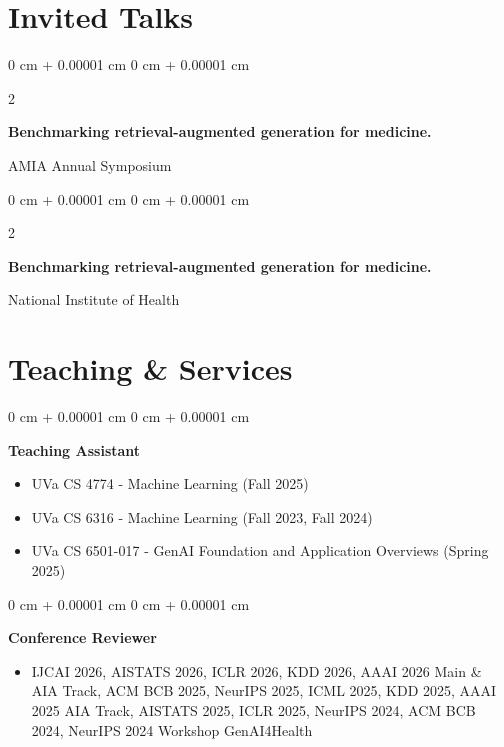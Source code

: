 \documentclass[10pt, letterpaper]{article}
\newenvironment{highlights}{
    \begin{itemize}[
        topsep=0.10 cm,
        parsep=0.10 cm,
        partopsep=0pt,
        itemsep=0pt,
        leftmargin=0 cm + 10pt
    ]
}{
    \end{itemize}
} %
\newenvironment{onecolentry}{
    \begin{adjustwidth}{
        0 cm + 0.00001 cm
    }{
        0 cm + 0.00001 cm
    }
}{
    \end{adjustwidth}
} %
\newenvironment{twocolentry}[2][]{
    \onecolentry
    \def\secondColumn{#2}
    \setcolumnwidth{\fill, 4.5 cm}
    \begin{paracol}{2}
}{
    \switchcolumn \raggedleft \secondColumn
    \end{paracol}
    \endonecolentry
} %
\begin{document}
    \section{Invited Talks}


    \begin{twocolentry}{
        2024
    }
    \textbf{Benchmarking retrieval-augmented generation for medicine.}
    \end{twocolentry}
    AMIA Annual Symposium

    \vspace{0.2 cm}
    
    \begin{twocolentry}{
        2024
    }
    \textbf{Benchmarking retrieval-augmented generation for medicine.}
    \end{twocolentry}
    National Institute of Health
    
    \section{Teaching \& Services}
    
    \begin{onecolentry}
    \textbf{Teaching Assistant} 
    \begin{highlights}
    \item UVa CS 4774 - Machine Learning (Fall 2025)
    \item UVa CS 6316 - Machine Learning (Fall 2023, Fall 2024)
    \item UVa CS 6501-017 - GenAI Foundation and Application Overviews (Spring 2025)
    \end{highlights}
    \end{onecolentry}

    \vspace{0.2 cm}
    
    \begin{onecolentry}
    \textbf{Conference Reviewer}
    \begin{highlights}
    \item IJCAI 2026, AISTATS 2026, ICLR 2026, KDD 2026, AAAI 2026 Main \& AIA Track, ACM BCB 2025, NeurIPS 2025, ICML 2025, KDD 2025, AAAI 2025 AIA Track, AISTATS 2025, ICLR 2025, NeurIPS 2024, ACM BCB 2024, NeurIPS 2024 Workshop GenAI4Health
    \end{highlights}
    \end{onecolentry}
\end{document}
